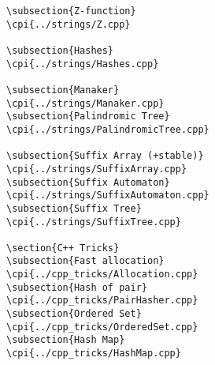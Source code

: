 {\begin{verbatim}
\subsection{Z-function}
\cpi{../strings/Z.cpp}

\subsection{Hashes}
\cpi{../strings/Hashes.cpp}

\subsection{Manaker}
\cpi{../strings/Manaker.cpp}
\subsection{Palindromic Tree}
\cpi{../strings/PalindromicTree.cpp}

\subsection{Suffix Array (+stable)}
\cpi{../strings/SuffixArray.cpp}
\subsection{Suffix Automaton}
\cpi{../strings/SuffixAutomaton.cpp}
\subsection{Suffix Tree}
\cpi{../strings/SuffixTree.cpp}

\section{C++ Tricks}
\subsection{Fast allocation}
\cpi{../cpp_tricks/Allocation.cpp}
\subsection{Hash of pair}
\cpi{../cpp_tricks/PairHasher.cpp}
\subsection{Ordered Set}
\cpi{../cpp_tricks/OrderedSet.cpp}
\subsection{Hash Map}
\cpi{../cpp_tricks/HashMap.cpp}

\end{verbatim}}
